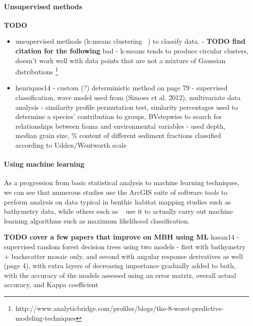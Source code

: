 \documentclass[12pt]{article}
\begin{document}
            \paragraph{Unsupervised methods}
            \textbf{TODO} 
            \begin{itemize}
            \item unsupervised methods (k-means clustering ~\citep*{henriques14}) to classify data. - \textbf{TODO find citation for the following} bad - k-means tends to produce circular clusters, doesn't work well with data points that are not a mixture of Gaussian distributions \footnote{http://www.analyticbridge.com/profiles/blogs/the-8-worst-predictive-modeling-techniques}
            \item henriques14 - custom (?) deterministic method on page 79 - supervised classification, wave model used from (Simoes et al. 2012), multivariate data analysis - similarity profile permutation test, simlarity percentages used to determine a species' contribution to groups, BVstepwise to search for relationships between fauna and environmental variables - used depth, median grain size, \% content of different sediment fractions classified according to Udden/Wentworth scale~\citep*{henriques14}
            \end{itemize}

            \paragraph {Using machine learning} As a progression from basic statistical analysis to machine learning techniques, we can see that numerous studies use the ArcGIS suite of software tools to perform analysis on data typical in benthic habitat mapping studies such as bathymetry data, while others such as ~\citet*{micallef12} use it to actually carry out machine learning algorithms such as maximum likelihood classification. 

            \textbf{TODO cover a few papers that improve on MBH using ML}
            hasan14 - supervised random forest decision trees using two models - first with bathymetry + backscatter mosaic only, and second with angular response derivatives as well (page 4), with extra layers of decreasing importance gradually added to both, with the accuracy of the models assessed using an error matrix, overall actual accuracy, and Kappa coefficient ~\citep*{hasan14}

\end{document}
